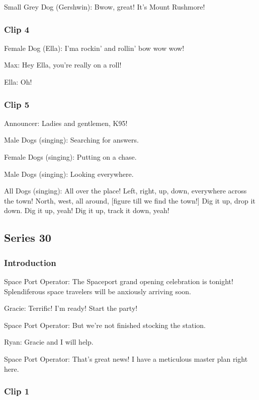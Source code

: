 Small Grey Dog (Gershwin): Bwow, great! It's Mount Rushmore!

\subsubsection{Clip 4}

Female Dog (Ella): I'ma rockin' and rollin' bow wow wow!

Max: Hey Ella, you're really on a roll!

Ella: Oh!

\subsubsection{Clip 5}

Announcer: Ladies and gentlemen, K95!

Male Dogs (singing): Searching for answers.

Female Dogs (singing): Putting on a chase.

Male Dogs (singing): Looking everywhere.

All Dogs (singing): All over the place! Left, right, up, down, everywhere across the town! North, west, all around, [figure till we find the town!] Dig it up, drop it down. Dig it up, yeah! Dig it up, track it down, yeah!

\subsection{Series 30}

\subsubsection{Introduction}

Space Port Operator: The Spaceport grand opening celebration is tonight! Splendiferous space travelers will be anxiously arriving soon.

Gracie: Terrific! I'm ready! Start the party!

Space Port Operator: But we're not finished stocking the station.

Ryan: Gracie and I will help.

Space Port Operator: That's great news! I have a meticulous master plan right here.

\subsubsection{Clip 1}

